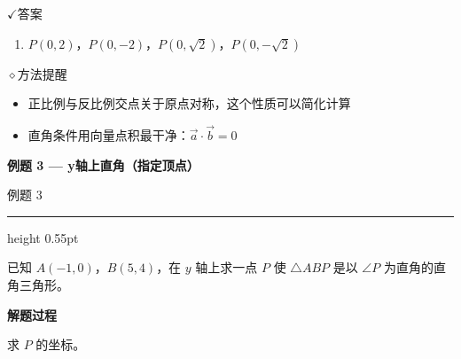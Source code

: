 \documentclass{exam-zh}
\newcommand{\eduSectionTitle}[1]{%
  \needspace{5\baselineskip}%
  \vspace{2mm}
  {\color{edu-blue}\bfseries\large #1}\par
  \vspace{3mm}
}
\newenvironment{eduSubQuestionItem}[1]{%
  \needspace{4\baselineskip}%
  \vspace{2mm}
  \par\noindent
  \hangindent=8mm\hangafter=1
  {\color{edu-blue}\bfseries #1}\enspace
  \begingroup
  \color{edu-ink}
}{%
  \endgroup
  \par
  \vspace{3mm}
}
\newcommand{\eduIconCheck}{\(\checkmark\)}
\newcommand{\eduIconPin}{\(\diamond\)}
\newenvironment{eduProblemBlock}[1][题目]{%
  \needspace{8\baselineskip}
  {\small\color{edu-muted}#1}\par
  \vspace{1.5mm}
  {\color{edu-blue}\hrule height 0.55pt}
  \vspace{4.5mm}
  \begingroup
  \color{edu-ink}
  \large
  \setlength{\parskip}{2.2mm}
  \linespread{1.20}\selectfont
}{%
  \par
  \endgroup
  \vspace{6mm}
}
\newenvironment{eduBulletList}{%
  \begin{itemize}[
    label=\textbullet,
    leftmargin=5mm,
    itemsep=1.2mm,
    topsep=0pt,
    parsep=0pt
  ]
}{%
  \end{itemize}
}
\newenvironment{eduBottomGrid}{%
  \vspace{1mm}
  \par\noindent
}{%
  \par\vspace{1mm}
}
\newenvironment{eduSummaryLeft}{%
  \begin{minipage}[t]{0.30\linewidth}
}{%
  \end{minipage}
}
\newcommand{\eduSummaryDivider}{%
  \hspace{4mm}{\color{edu-line}\vrule width 0.35pt}\hspace{7mm}%
}
\newenvironment{eduSummaryRight}{%
  \begin{minipage}[t]{0.58\linewidth}
}{%
  \end{minipage}
}
\newenvironment{eduPlainList}{%
  \begin{enumerate}[
    label=(\arabic*),
    leftmargin=7mm,
    itemsep=1.2mm,
    topsep=0pt,
    parsep=0pt
  ]
}{%
  \end{enumerate}
}
\begin{document}
\begin{eduBottomGrid}
  \begin{eduSummaryLeft}
    \begin{eduSummaryBlock}{\eduIconCheck}{答案}
    \begin{eduPlainList}
      \item $P(0,2)$，$P(0,-2)$，$P(0,\sqrt{2})$，$P(0,-\sqrt{2})$    \end{eduPlainList}
    \end{eduSummaryBlock}
  \end{eduSummaryLeft}
  \eduSummaryDivider
  \begin{eduSummaryRight}
    \begin{eduSummaryBlock}{\eduIconPin}{方法提醒}
    \begin{eduBulletList}
      \item 正比例与反比例交点关于原点对称，这个性质可以简化计算      \item 直角条件用向量点积最干净：$\vec{a}\cdot\vec{b}=0$    \end{eduBulletList}
    \end{eduSummaryBlock}
  \end{eduSummaryRight}
\end{eduBottomGrid}



\eduSectionTitle{例题 3 — y轴上直角（指定顶点）}

\begin{eduProblemBlock}[例题 3]
已知 $A(-1,0)$，$B(5,4)$，在 $y$ 轴上求一点 $P$ 使 $\triangle ABP$ 是以 $\angle P$ 为直角的直角三角形。
\end{eduProblemBlock}





\begin{eduSubQuestionItem}{解题过程}
求 $P$ 的坐标。\end{eduSubQuestionItem}
\end{document}
